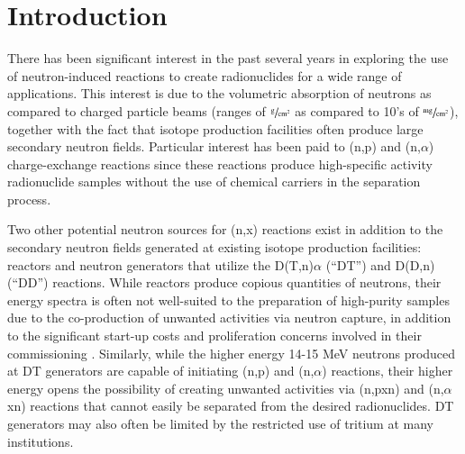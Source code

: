 \documentclass[5p]{elsarticle}
\begin{document}

\listoftodos


\section{Introduction} \label{sec:intro}

%
%
%

There has been significant interest in the past several years in exploring the use of neutron-induced reactions to create radionuclides for a wide range of applications.
This interest is due to the volumetric absorption of neutrons as compared to charged particle beams (ranges of $\sfrac{\text{g}}{\text{cm}^2}$ as compared to 10's of $\sfrac{\text{mg}}{\text{cm}^2}$), together with the fact that isotope production facilities often produce large secondary neutron fields.
 Particular interest has been paid to (n,p) and (n,$\alpha$) charge-exchange reactions since these reactions produce high-specific activity radionuclide samples without the use of chemical carriers in the separation process.
 

Two other potential neutron sources for (n,x) reactions exist in addition to the secondary neutron fields generated at existing isotope production facilities: reactors and neutron generators that utilize the D(T,n)$\alpha$ (\enquote{DT}) and D(D,n) (\enquote{DD}) reactions.
 While reactors produce copious quantities of neutrons, their energy spectra is often not well-suited to the preparation of high-purity samples due to the co-production of unwanted activities via neutron capture, in addition to the significant start-up costs and proliferation concerns involved in their commissioning \cite{Updegraff2013}.
 Similarly, while the higher energy 14-15 MeV neutrons produced at DT generators are capable of initiating (n,p) and (n,$\alpha$) reactions, their higher energy opens the possibility of creating unwanted activities via (n,pxn) and (n,$\alpha$xn) reactions that cannot easily be separated from the desired radionuclides. DT generators may also often be limited by the restricted use of tritium at many institutions.
 
\end{document}
